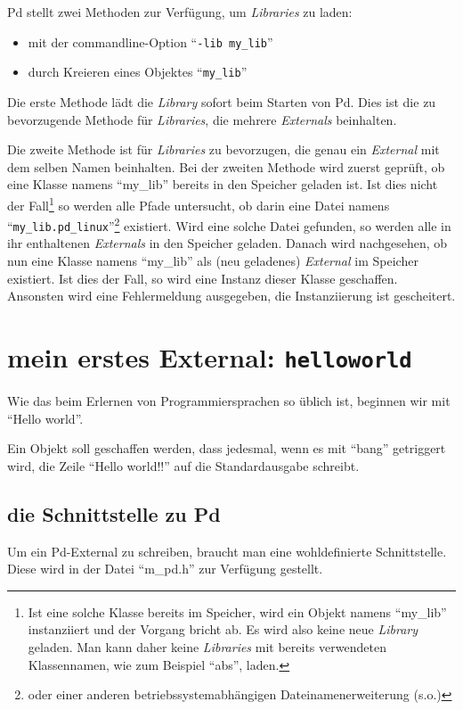 \documentclass[12pt, a4paper,austrian, titlepage]{article}
\begin{document}
Pd stellt zwei Methoden zur Verfügung, um {\em Libraries} zu laden:
\begin{itemize}
\item mit der commandline-Option ``{\tt -lib my\_lib}''
\item durch Kreieren eines Objektes ``{\tt my\_lib}''
\end{itemize}

Die erste Methode lädt die {\em Library} sofort beim Starten von Pd.
Dies ist die zu bevorzugende Methode für {\em Libraries},
die mehrere {\em Externals} beinhalten.

Die zweite Methode ist für {\em Libraries} zu bevorzugen, die genau
ein {\em External} mit dem selben Namen beinhalten.
Bei der zweiten Methode wird zuerst geprüft, ob eine Klasse namens ``my\_lib'' bereits
in den Speicher geladen ist.
Ist dies nicht der Fall\footnote
{Ist eine solche Klasse bereits im Speicher, wird ein
Objekt namens ``my\_lib'' instanziiert und der Vorgang bricht ab.
Es wird also keine neue {\em Library} geladen.
Man kann daher keine {\em Libraries} mit bereits verwendeten Klassennamen,
wie zum Beispiel ``abs'', laden.}
so werden alle Pfade untersucht,
ob darin eine Datei namens ``{\tt my\_lib.pd\_linux}''\footnote{
oder einer anderen betriebssystemabhängigen Dateinamenerweiterung (s.o.)}
existiert.
Wird eine solche Datei gefunden, so werden alle in ihr enthaltenen {\em Externals}
in den Speicher geladen.
Danach wird nachgesehen, ob nun eine Klasse namens ``my\_lib''
als (neu geladenes) {\em External} im Speicher existiert.
Ist dies der Fall, so wird eine Instanz dieser Klasse geschaffen.
Ansonsten wird eine Fehlermeldung ausgegeben, die Instanziierung ist gescheitert.


\section{mein erstes External: {\tt helloworld}}
Wie das beim Erlernen von Programmiersprachen so üblich ist,
beginnen wir mit ``Hello world''.

Ein Objekt soll geschaffen werden, dass jedesmal, wenn es
mit ``bang'' getriggert wird, die Zeile ``Hello world!!'' auf
die Standardausgabe schreibt.

\subsection{die Schnittstelle zu Pd}
Um ein Pd-External zu schreiben, braucht man eine wohldefinierte Schnittstelle.
Diese wird in der Datei ``m\_pd.h'' zur Verfügung gestellt.
\end{document}
